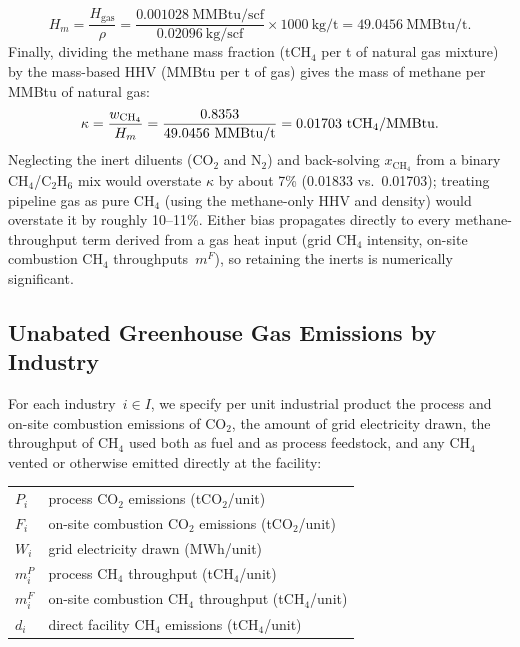 \documentclass[11pt]{article}
\newcommand{\cotwo}{\ensuremath{\mathrm{CO_2}}}
\newcommand{\chfour}{\ensuremath{\mathrm{CH_4}}}
\begin{document}
%
\begin{equation}
    H_{m} = \frac{H_{\text{gas}}}{\rho} = \frac{0.001028~\text{MMBtu/scf}}{0.02096~\text{kg/scf}} \times 1000~\text{kg/t} = 49.0456~\text{MMBtu/t}.
    \label{eq:mass_hhv}
\end{equation}
%
Finally, dividing the methane mass fraction (t\chfour{} per t of natural gas mixture) by the mass-based HHV (MMBtu per t of gas) gives the mass of methane per MMBtu of natural gas:
%
\begin{equation}
    \kappa = \frac{w_{\chfour}}{H_{m}} = \frac{0.8353}{49.0456~\text{MMBtu/t}} = 0.01703~\text{t\chfour{}/MMBtu}.
    \label{eq:kappa}
\end{equation}
%
Neglecting the inert diluents (\cotwo{} and N$_2$) and back-solving $x_{\chfour}$ from a binary \chfour{}/C$_2$H$_6$ mix would overstate $\kappa$ by about 7\% (0.01833 vs.\ 0.01703); treating pipeline gas as pure \chfour{} (using the methane-only HHV and density) would overstate it by roughly 10--11\%. Either bias propagates directly to every methane-throughput term derived from a gas heat input (grid \chfour{} intensity, on-site combustion \chfour{} throughputs~$m^F$), so retaining the inerts is numerically significant.
%

\subsection{Unabated Greenhouse Gas Emissions by Industry}
\label{sec:industrial}

For each industry~$i \in I$, we specify per unit industrial product the process and on-site combustion emissions of \cotwo{}, the amount of grid electricity drawn, the throughput of \chfour{} used both as fuel and as process feedstock, and any \chfour{} vented or otherwise emitted directly at the facility:

\begin{center}
\begin{tabular}{ll}
$P_i$ & process \cotwo{} emissions (t\cotwo{}/unit) \\
$F_i$ & on-site combustion \cotwo{} emissions (t\cotwo{}/unit) \\
$W_i$ & grid electricity drawn (MWh/unit) \\
$m_i^P$ & process \chfour{} throughput (t\chfour{}/unit) \\
$m_i^F$ & on-site combustion \chfour{} throughput (t\chfour{}/unit) \\
$d_i$ & direct facility \chfour{} emissions (t\chfour{}/unit)

\end{tabular}
\end{center}
\end{document}
